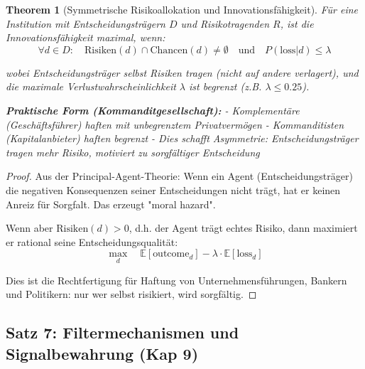 \documentclass[a4paper, 12pt, twoside, openright]{report}
\newtheorem{theorem}{Theorem}[section]
\theoremstyle{definition}
\theoremstyle{definition}
\begin{document}
\begin{theorem}[Symmetrische Risikoallokation und Innovationsfähigkeit]
\label{thm:risikoallokation}
Für eine Institution mit Entscheidungsträgern $D$ und Risikotragenden $R$, ist die Innovationsfähigkeit maximal, wenn:
\begin{equation}
\forall d \in D: \quad \text{Risiken}(d) \cap \text{Chancen}(d) \neq \emptyset \quad \text{und} \quad P(\text{loss}|d) \leq \lambda
\end{equation}

wobei Entscheidungsträger selbst Risiken tragen (nicht auf andere verlagert), und die maximale Verlustwahrscheinlichkeit $\lambda$ ist begrenzt (z.B. $\lambda \leq 0.25$).

\textbf{Praktische Form (Kommanditgesellschaft):} 
- Komplementäre (Geschäftsführer) haften mit unbegrenztem Privatvermögen
- Kommanditisten (Kapitalanbieter) haften begrenzt
- Dies schafft Asymmetrie: Entscheidungsträger tragen mehr Risiko, motiviert zu sorgfältiger Entscheidung
\end{theorem}

\begin{proof}
Aus der Principal-Agent-Theorie: Wenn ein Agent (Entscheidungsträger) die negativen Konsequenzen seiner Entscheidungen nicht trägt, hat er keinen Anreiz für Sorgfalt. Das erzeugt "moral hazard".

Wenn aber $\text{Risiken}(d) > 0$, d.h. der Agent trägt echtes Risiko, dann maximiert er rational seine Entscheidungsqualität:
\begin{equation}
\max_d \quad \mathbb{E}[\text{outcome}_d] - \lambda \cdot \mathbb{E}[\text{loss}_d]
\end{equation}

Dies ist die Rechtfertigung für Haftung von Unternehmensführungen, Bankern und Politikern: nur wer selbst risikiert, wird sorgfältig.
\end{proof}

\subsection{Satz 7: Filtermechanismen und Signalbewahrung (Kap 9)}
\end{document}
